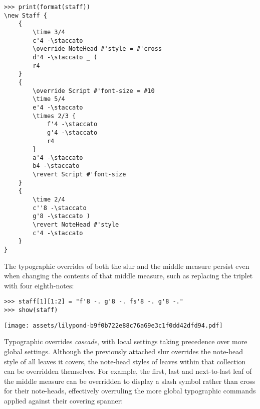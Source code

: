 \begin{comment}
<abjad>
print(format(staff))
</abjad>
\end{comment}

\begin{abjadbookoutput}
\begin{singlespacing}
\vspace{-0.5\baselineskip}
\begin{lstlisting}
>>> print(format(staff))
\new Staff {
    {
        \time 3/4
        c'4 -\staccato
        \override NoteHead #'style = #'cross
        d'4 -\staccato _ (
        r4
    }
    {
        \override Script #'font-size = #10
        \time 5/4
        e'4 -\staccato
        \times 2/3 {
            f'4 -\staccato
            g'4 -\staccato
            r4
        }
        a'4 -\staccato
        b4 -\staccato
        \revert Script #'font-size
    }
    {
        \time 2/4
        c''8 -\staccato
        g'8 -\staccato )
        \revert NoteHead #'style
        c'4 -\staccato
    }
}
\end{lstlisting}
\end{singlespacing}
\end{abjadbookoutput}

\noindent The typographic overrides of both the slur and the middle measure
persist even when changing the contents of that middle measure, such as
replacing the triplet with four eighth-notes:

\begin{comment}
<abjad>
staff[1][1:2] = "f'8 -. g'8 -. fs'8 -. g'8 -."
show(staff)
</abjad>
\end{comment}

\begin{abjadbookoutput}
\begin{singlespacing}
\vspace{-0.5\baselineskip}
\begin{lstlisting}
>>> staff[1][1:2] = "f'8 -. g'8 -. fs'8 -. g'8 -."
>>> show(staff)
\end{lstlisting}
\noindent\texttt{[image: assets/lilypond-b9f0b722e88c76a69e3c1f0dd42dfd94.pdf]}
\end{singlespacing}
\end{abjadbookoutput}

\noindent Typographic overrides \emph{cascade}, with local settings taking
precedence over more global settings. Although the previously attached slur
overrides the note-head style of all leaves it covers, the note-head styles of
leaves within that collection can be overridden themselves. For example, the
first, last and next-to-last leaf of the middle measure can be overridden to
display a slash symbol rather than cross for their note-heads, effectively
overruling the more global typographic commands applied against their covering
spanner:

